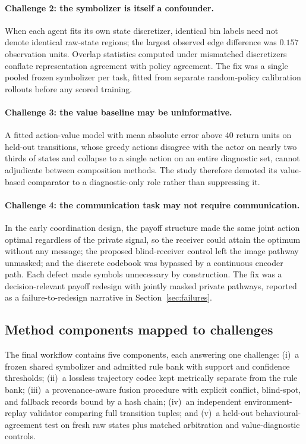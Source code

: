 \documentclass[11pt,a4paper]{article}
\theoremstyle{definition}
\begin{document}
\paragraph{Challenge 2: the symbolizer is itself a confounder.}
When each agent fits its own state discretizer, identical bin labels need not
denote identical raw-state regions; the largest observed edge difference was
$0.157$ observation units. Overlap statistics computed under mismatched
discretizers conflate representation agreement with policy agreement. The fix
was a single pooled frozen symbolizer per task, fitted from separate
random-policy calibration rollouts before any scored training.

\paragraph{Challenge 3: the value baseline may be uninformative.}
A fitted action-value model with mean absolute error above $40$ return units
on held-out transitions, whose greedy actions disagree with the actor on
nearly two thirds of states and collapse to a single action on an entire
diagnostic set, cannot adjudicate between composition methods. The study
therefore demoted its value-based comparator to a diagnostic-only role rather
than suppressing it.

\paragraph{Challenge 4: the communication task may not require
communication.}
In the early coordination design, the payoff structure made the same joint
action optimal regardless of the private signal, so the receiver could attain
the optimum without any message; the proposed blind-receiver control left the
image pathway unmasked; and the discrete codebook was bypassed by a
continuous encoder path. Each defect made symbols unnecessary by
construction. The fix was a decision-relevant payoff redesign with jointly
masked private pathways, reported as a failure-to-redesign narrative in
Section~\ref{sec:failures}.

\subsection{Method components mapped to challenges}

The final workflow contains five components, each answering one challenge:
(i)~a frozen shared symbolizer and admitted rule bank with support and
confidence thresholds; (ii)~a lossless trajectory codec kept metrically
separate from the rule bank; (iii)~a provenance-aware fusion procedure with
explicit conflict, blind-spot, and fallback records bound by a hash chain;
(iv)~an independent environment-replay validator comparing full transition
tuples; and (v)~a held-out behavioural-agreement test on fresh raw states
plus matched arbitration and value-diagnostic controls.
\end{document}
